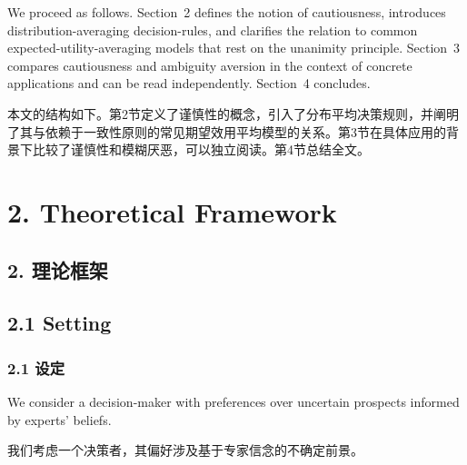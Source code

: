 \documentclass[12pt,a4paper]{article}
\newenvironment{original}
  {\par\noindent\ignorespaces}
  {\par}
\newenvironment{translation}
  {\par\noindent{\color{transblue}\ignorespaces}}
  {\par\medskip}
\begin{document}
\begin{original}
We proceed as follows. Section~2 defines the notion of cautiousness, introduces distribution-averaging decision-rules, and clarifies the relation to common expected-utility-averaging models that rest on the unanimity principle. Section~3 compares cautiousness and ambiguity aversion in the context of concrete applications and can be read independently. Section~4 concludes.
\end{original}

\begin{translation}
本文的结构如下。第2节定义了谨慎性的概念，引入了分布平均决策规则，并阐明了其与依赖于一致性原则的常见期望效用平均模型的关系。第3节在具体应用的背景下比较了谨慎性和模糊厌恶，可以独立阅读。第4节总结全文。
\end{translation}

\newpage

\section{2. Theoretical Framework}
{\color{transblue}\subsection*{2. 理论框架}}

\subsection{2.1 Setting}
{\color{transblue}\subsubsection*{2.1 设定}}

\begin{original}
We consider a decision-maker with preferences over uncertain prospects informed by experts' beliefs.
\end{original}

\begin{translation}
我们考虑一个决策者，其偏好涉及基于专家信念的不确定前景。
\end{translation}
\end{document}
